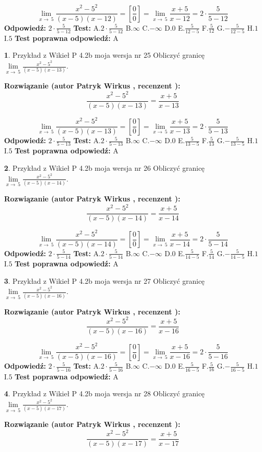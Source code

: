 \documentclass[12pt, a4paper]{article}
\theoremstyle{definition} %
\newtheorem{zad}{}
\newcommand{\zadStart}[1]{\begin{zad}#1\newline}
\newcommand{\zadStop}{\end{zad}}
\newcommand{\rozwStart}[2]{\noindent \textbf{Rozwiązanie (autor #1 , recenzent #2): }\newline}
\newcommand{\rozwStop}{\newline}
\newcommand{\odpStart}{\noindent \textbf{Odpowiedź:}\newline}
\newcommand{\odpStop}{\newline}
\newcommand{\testStart}{\noindent \textbf{Test:}\newline}
\newcommand{\testStop}{\newline}
\newcommand{\kluczStart}{\noindent \textbf{Test poprawna odpowiedź:}\newline}
\newcommand{\kluczStop}{\newline}
\begin{document}
$$\lim\limits_{x\to\ 5}\frac{x^{2}-5^{2}}{(x-5)(x-12)}=[\frac{0}{0}]=\lim\limits_{x\to\ 5}\frac{x+5}{x-12}=2 \cdot \frac{5}{5-12}$$
\rozwStop
\odpStart
$2 \cdot \frac{5}{5-12}$
\odpStop
\testStart
A.$2 \cdot \frac{5}{5-12}$
B.$\infty$
C.$-\infty$
D.$0$
E.$\frac{5}{12-5}$
F.$\frac{5}{12}$
G.$-\frac{5}{12-5}$
H.$1$
I.$5$
\testStop
\kluczStart
A
\kluczStop



\zadStart{Przykład z Wikieł P 4.2b moja wersja nr 25}
Obliczyć granicę $\lim\limits_{x\to\ 5}\frac{x^{2}-5^{2}}{(x-5)(x-13)}$.
\zadStop
\rozwStart{Patryk Wirkus}{}
$$\frac{x^{2}-5^{2}}{(x-5)(x-13)}=\frac{x+5}{x-13}$$

$$\lim\limits_{x\to\ 5}\frac{x^{2}-5^{2}}{(x-5)(x-13)}=[\frac{0}{0}]=\lim\limits_{x\to\ 5}\frac{x+5}{x-13}=2 \cdot \frac{5}{5-13}$$
\rozwStop
\odpStart
$2 \cdot \frac{5}{5-13}$
\odpStop
\testStart
A.$2 \cdot \frac{5}{5-13}$
B.$\infty$
C.$-\infty$
D.$0$
E.$\frac{5}{13-5}$
F.$\frac{5}{13}$
G.$-\frac{5}{13-5}$
H.$1$
I.$5$
\testStop
\kluczStart
A
\kluczStop



\zadStart{Przykład z Wikieł P 4.2b moja wersja nr 26}
Obliczyć granicę $\lim\limits_{x\to\ 5}\frac{x^{2}-5^{2}}{(x-5)(x-14)}$.
\zadStop
\rozwStart{Patryk Wirkus}{}
$$\frac{x^{2}-5^{2}}{(x-5)(x-14)}=\frac{x+5}{x-14}$$

$$\lim\limits_{x\to\ 5}\frac{x^{2}-5^{2}}{(x-5)(x-14)}=[\frac{0}{0}]=\lim\limits_{x\to\ 5}\frac{x+5}{x-14}=2 \cdot \frac{5}{5-14}$$
\rozwStop
\odpStart
$2 \cdot \frac{5}{5-14}$
\odpStop
\testStart
A.$2 \cdot \frac{5}{5-14}$
B.$\infty$
C.$-\infty$
D.$0$
E.$\frac{5}{14-5}$
F.$\frac{5}{14}$
G.$-\frac{5}{14-5}$
H.$1$
I.$5$
\testStop
\kluczStart
A
\kluczStop



\zadStart{Przykład z Wikieł P 4.2b moja wersja nr 27}
Obliczyć granicę $\lim\limits_{x\to\ 5}\frac{x^{2}-5^{2}}{(x-5)(x-16)}$.
\zadStop
\rozwStart{Patryk Wirkus}{}
$$\frac{x^{2}-5^{2}}{(x-5)(x-16)}=\frac{x+5}{x-16}$$

$$\lim\limits_{x\to\ 5}\frac{x^{2}-5^{2}}{(x-5)(x-16)}=[\frac{0}{0}]=\lim\limits_{x\to\ 5}\frac{x+5}{x-16}=2 \cdot \frac{5}{5-16}$$
\rozwStop
\odpStart
$2 \cdot \frac{5}{5-16}$
\odpStop
\testStart
A.$2 \cdot \frac{5}{5-16}$
B.$\infty$
C.$-\infty$
D.$0$
E.$\frac{5}{16-5}$
F.$\frac{5}{16}$
G.$-\frac{5}{16-5}$
H.$1$
I.$5$
\testStop
\kluczStart
A
\kluczStop



\zadStart{Przykład z Wikieł P 4.2b moja wersja nr 28}
Obliczyć granicę $\lim\limits_{x\to\ 5}\frac{x^{2}-5^{2}}{(x-5)(x-17)}$.
\zadStop
\rozwStart{Patryk Wirkus}{}
$$\frac{x^{2}-5^{2}}{(x-5)(x-17)}=\frac{x+5}{x-17}$$
\end{document}
